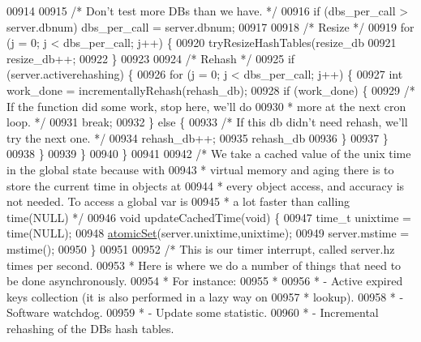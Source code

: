 \begin{DoxyCode}
{{{{{00914 
00915         \textcolor{comment}{/* Don't test more DBs than we have. */}
00916         \textcolor{keywordflow}{if} (dbs\_per\_call > server.dbnum) dbs\_per\_call = server.dbnum;
00917 
00918         \textcolor{comment}{/* Resize */}
00919         \textcolor{keywordflow}{for} (j = 0; j < dbs\_per\_call; j++) \{
00920             tryResizeHashTables(resize\_db %
00921             resize\_db++;
00922         \}
00923 
00924         \textcolor{comment}{/* Rehash */}
00925         \textcolor{keywordflow}{if} (server.activerehashing) \{
00926             \textcolor{keywordflow}{for} (j = 0; j < dbs\_per\_call; j++) \{
00927                 \textcolor{keywordtype}{int} work\_done = incrementallyRehash(rehash\_db);
00928                 \textcolor{keywordflow}{if} (work\_done) \{
00929                     \textcolor{comment}{/* If the function did some work, stop here, we'll do}
00930 \textcolor{comment}{                     * more at the next cron loop. */}
00931                     \textcolor{keywordflow}{break};
00932                 \} \textcolor{keywordflow}{else} \{
00933                     \textcolor{comment}{/* If this db didn't need rehash, we'll try the next one. */}
00934                     rehash\_db++;
00935                     rehash\_db %
00936                 \}
00937             \}
00938         \}
00939     \}
00940 \}
00941 
00942 \textcolor{comment}{/* We take a cached value of the unix time in the global state because with}
00943 \textcolor{comment}{ * virtual memory and aging there is to store the current time in objects at}
00944 \textcolor{comment}{ * every object access, and accuracy is not needed. To access a global var is}
00945 \textcolor{comment}{ * a lot faster than calling time(NULL) */}
00946 \textcolor{keywordtype}{void} updateCachedTime(\textcolor{keywordtype}{void}) \{
00947     time\_t unixtime = time(NULL);
00948     \hyperlink{atomicvar_8h_a0f02b5846dcf4ed3669ecf771c512d12}{atomicSet}(server.unixtime,unixtime);
00949     server.mstime = mstime();
00950 \}
00951 
00952 \textcolor{comment}{/* This is our timer interrupt, called server.hz times per second.}
00953 \textcolor{comment}{ * Here is where we do a number of things that need to be done asynchronously.}
00954 \textcolor{comment}{ * For instance:}
00955 \textcolor{comment}{ *}
00956 \textcolor{comment}{ * - Active expired keys collection (it is also performed in a lazy way on}
00957 \textcolor{comment}{ *   lookup).}
00958 \textcolor{comment}{ * - Software watchdog.}
00959 \textcolor{comment}{ * - Update some statistic.}
00960 \textcolor{comment}{ * - Incremental rehashing of the DBs hash tables.}
}}}}}
\end{DoxyCode}
